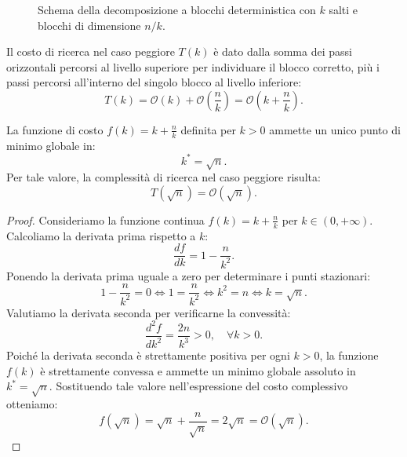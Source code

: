 \begin{figure}[htbp]
{%
}
\caption{Schema della decomposizione a blocchi deterministica con $k$ salti e blocchi di dimensione $n/k$.}
\label{fig:square-root-decomposition-schema}
\end{figure}

Il costo di ricerca nel caso peggiore $T(k)$ è dato dalla somma dei passi orizzontali percorsi al livello superiore per individuare il blocco corretto, più i passi percorsi all'interno del singolo blocco al livello inferiore:
\begin{equation}
  T(k) = \mathcal{O}(k) + \mathcal{O}\left(\frac{n}{k}\right) = \mathcal{O}\left(k + \frac{n}{k}\right).
\end{equation}

\begin{theorem}
La funzione di costo $f(k) = k + \frac{n}{k}$ definita per $k > 0$ ammette un unico punto di minimo globale in:
\begin{equation}
  k^* = \sqrt{n}.
\end{equation}
Per tale valore, la complessità di ricerca nel caso peggiore risulta:
\begin{equation}
  T(\sqrt{n}) = \mathcal{O}(\sqrt{n}).
\end{equation}
\end{theorem}

\begin{proof}
Consideriamo la funzione continua $f(k) = k + \frac{n}{k}$ per $k \in (0, +\infty)$. Calcoliamo la derivata prima rispetto a $k$:
\begin{equation}
  \frac{df}{dk} = 1 - \frac{n}{k^2}.
\end{equation}
Ponendo la derivata prima uguale a zero per determinare i punti stazionari:
\begin{equation}
  1 - \frac{n}{k^2} = 0 \iff 1 = \frac{n}{k^2} \iff k^2 = n \iff k = \sqrt{n}.
\end{equation}
Valutiamo la derivata seconda per verificarne la convessità:
\begin{equation}
  \frac{d^2f}{dk^2} = \frac{2n}{k^3} > 0, \quad \forall k > 0.
\end{equation}
Poiché la derivata seconda è strettamente positiva per ogni $k > 0$, la funzione $f(k)$ è strettamente convessa e ammette un minimo globale assoluto in $k^* = \sqrt{n}$. Sostituendo tale valore nell'espressione del costo complessivo otteniamo:
\begin{equation}
  f(\sqrt{n}) = \sqrt{n} + \frac{n}{\sqrt{n}} = 2\sqrt{n} = \mathcal{O}(\sqrt{n}).
\end{equation}
\end{proof}

